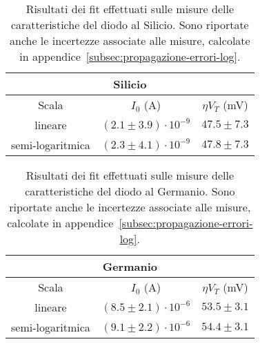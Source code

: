 \documentclass[@SRC@/main]{subfiles}
\begin{document}
    \begin{table}[ht]
        \centering
        \begin{tabular}{||c|c|c||}
            \hline
            \multicolumn{3}{||c||}{Silicio} \\
            \hline
            Scala            & $I_0$ (\textnormal{A})       & $\eta V_T$ (\textnormal{mV}) \\
            \hline
            lineare          & $(2.1\pm3.9)\cdot 10^{-9}$   & $47.5\pm7.3$                 \\
            \hline
            semi-logaritmica & $(2.3 \pm 4.1)\cdot 10^{-9}$ & $47.8\pm 7.3$                \\
            \hline
        \end{tabular}
        \caption{Risultati dei fit effettuati sulle misure delle caratteristiche del diodo
        al Silicio. Sono riportate anche le incertezze associate alle misure, calcolate in
        appendice~\ref{subsec:propagazione-errori-log}.}
        \label{tab:fit-silicio}
    \end{table}

    \begin{table}[ht]
        \centering
        \begin{tabular}{||c|c|c||}
            \hline
            \multicolumn{3}{||c||}{Germanio} \\
            \hline
            Scala            & $I_0$ (\textnormal{A})       & $\eta V_T $ (\textnormal{mV}) \\
            \hline
            lineare          & $(8.5\pm2.1) \cdot 10^{-6}$  & $53.5\pm3.1$                  \\
            \hline
            semi-logaritmica & $(9.1\pm 2.2) \cdot 10^{-6}$ & $54.4\pm3.1$                  \\
            \hline
        \end{tabular}
        \caption{Risultati dei fit effettuati sulle misure delle caratteristiche del diodo
        al Germanio. Sono riportate anche le incertezze associate alle misure, calcolate in
        appendice~\ref{subsec:propagazione-errori-log}.}
        \label{tab:fit-germanio}
    \end{table}

\end{document}
